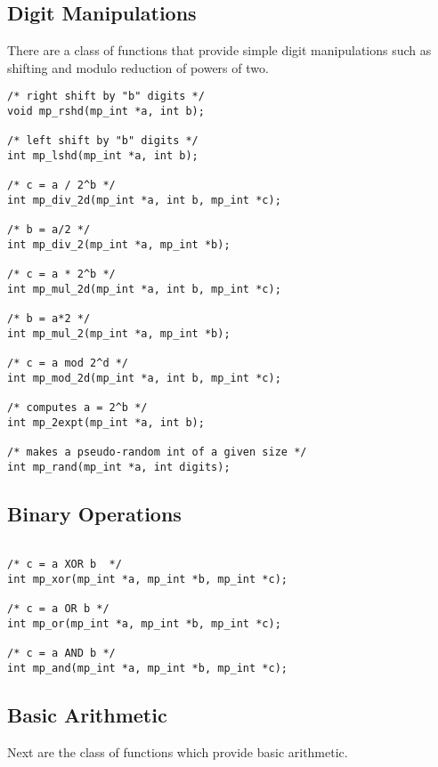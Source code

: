 \documentclass{article}
\begin{document}
\subsection{Digit Manipulations}

There are a class of functions that provide simple digit manipulations such as shifting and modulo reduction of powers
of two.  

\begin{verbatim}
/* right shift by "b" digits */
void mp_rshd(mp_int *a, int b);

/* left shift by "b" digits */
int mp_lshd(mp_int *a, int b);

/* c = a / 2^b */
int mp_div_2d(mp_int *a, int b, mp_int *c);

/* b = a/2 */
int mp_div_2(mp_int *a, mp_int *b);

/* c = a * 2^b */
int mp_mul_2d(mp_int *a, int b, mp_int *c);

/* b = a*2 */
int mp_mul_2(mp_int *a, mp_int *b);

/* c = a mod 2^d */
int mp_mod_2d(mp_int *a, int b, mp_int *c);

/* computes a = 2^b */
int mp_2expt(mp_int *a, int b);

/* makes a pseudo-random int of a given size */
int mp_rand(mp_int *a, int digits);

\end{verbatim}

\subsection{Binary Operations}

\begin{verbatim}

/* c = a XOR b  */
int mp_xor(mp_int *a, mp_int *b, mp_int *c);

/* c = a OR b */
int mp_or(mp_int *a, mp_int *b, mp_int *c);

/* c = a AND b */
int mp_and(mp_int *a, mp_int *b, mp_int *c);

\end{verbatim}

\subsection{Basic Arithmetic}

Next are the class of functions which provide basic arithmetic.
\end{document}
